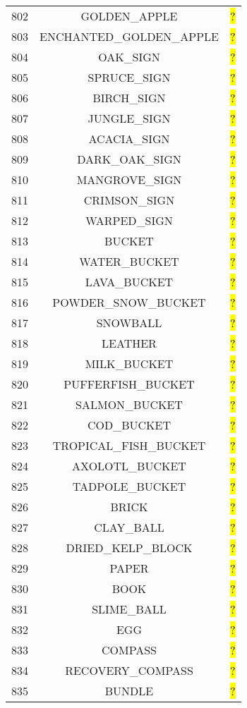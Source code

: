 \documentclass[11pt]{article}
\newcommand\myworries[1]{\sethlcolor{red}\hl{#1}}
\begin{document}
\begin{longtable}{ |c|c|c| }
802 & GOLDEN\_APPLE & \myworries{?} \\
803 & ENCHANTED\_GOLDEN\_APPLE & \myworries{?} \\
804 & OAK\_SIGN & \myworries{?} \\
805 & SPRUCE\_SIGN & \myworries{?} \\
806 & BIRCH\_SIGN & \myworries{?} \\
807 & JUNGLE\_SIGN & \myworries{?} \\
808 & ACACIA\_SIGN & \myworries{?} \\
809 & DARK\_OAK\_SIGN & \myworries{?} \\
810 & MANGROVE\_SIGN & \myworries{?} \\
811 & CRIMSON\_SIGN & \myworries{?} \\
812 & WARPED\_SIGN & \myworries{?} \\
813 & BUCKET & \myworries{?} \\
814 & WATER\_BUCKET & \myworries{?} \\
815 & LAVA\_BUCKET & \myworries{?} \\
816 & POWDER\_SNOW\_BUCKET & \myworries{?} \\
817 & SNOWBALL & \myworries{?} \\
818 & LEATHER & \myworries{?} \\
819 & MILK\_BUCKET & \myworries{?} \\
820 & PUFFERFISH\_BUCKET & \myworries{?} \\
821 & SALMON\_BUCKET & \myworries{?} \\
822 & COD\_BUCKET & \myworries{?} \\
823 & TROPICAL\_FISH\_BUCKET & \myworries{?} \\
824 & AXOLOTL\_BUCKET & \myworries{?} \\
825 & TADPOLE\_BUCKET & \myworries{?} \\
826 & BRICK & \myworries{?} \\
827 & CLAY\_BALL & \myworries{?} \\
828 & DRIED\_KELP\_BLOCK & \myworries{?} \\
829 & PAPER & \myworries{?} \\
830 & BOOK & \myworries{?} \\
831 & SLIME\_BALL & \myworries{?} \\
832 & EGG & \myworries{?} \\
833 & COMPASS & \myworries{?} \\
834 & RECOVERY\_COMPASS & \myworries{?} \\
835 & BUNDLE & \myworries{?} \\

\end{longtable}
\end{document}
